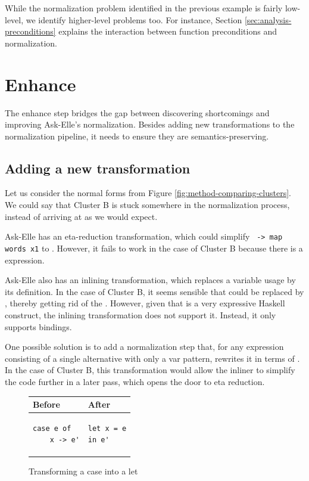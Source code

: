 While the normalization problem identified in the previous example is fairly low-level, we identify higher-level problems too. For instance, Section \ref{sec:analysis-preconditions} explains the interaction between function preconditions and normalization.

\section{Enhance}
\label{sec:method-enhance}

The enhance step bridges the gap between discovering shortcomings and improving Ask-Elle's normalization. Besides adding new transformations to the normalization pipeline, it needs to ensure they are semantics-preserving.

\subsection{Adding a new transformation}

Let us consider the normal forms from Figure \ref{fig:method-comparing-clusters}. We could say that Cluster B is stuck somewhere in the normalization process, instead of arriving at  as we would expect.

Ask-Elle has an eta-reduction transformation, which could simplify \texttt{ -> map words x1} to . However, it fails to work in the case of Cluster B because there is a  expression.

Ask-Elle also has an inlining transformation, which replaces a variable usage by its definition. In the case of Cluster B, it seems sensible that  could be replaced by , thereby getting rid of the . However, given that  is a very expressive Haskell construct, the inlining transformation does not support it. Instead, it only supports  bindings.

One possible solution is to add a normalization step that, for any  expression consisting of a single alternative with only a var pattern, rewrites it in terms of . In the case of Cluster B, this transformation would allow the inliner to simplify the code further in a later pass, which opens the door to eta reduction.

\begin{figure}[H]
\centering
\begin{tabular}{ m{8em} | m{8em} }
    Before & After \\
    \hline
    \begin{verbatim}
case e of
    x -> e'
    \end{verbatim}
    &
    \begin{verbatim}
let x = e
in e'
    \end{verbatim}
\end{tabular}
\caption{Transforming a case into a let}
\label{fig:method-case-to-let}
\end{figure}

